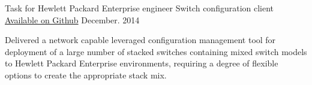 \begin{cventries}
  \cventry
    {Task for Hewlett Packard Enterprise engineer} %
    {Switch configuration client} %
    {\href{https://github.com/mmacheerpuppy/switcharoo}{Available on Github}} %
    {December. 2014} %
    {
      \begin{cvitems} %
  \item {Delivered a network capable leveraged configuration management tool for deployment of a large number of stacked switches containing mixed switch models to Hewlett Packard Enterprise environments, requiring a degree of flexible options to create the appropriate stack mix.}
      \end{cvitems}
    }

\end{cventries}

